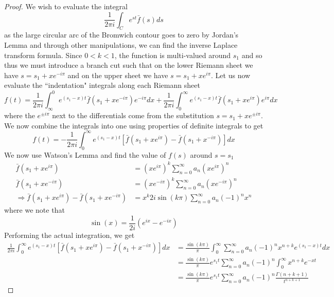 \documentclass{report}
\theoremstyle{definition}
\theoremstyle{remark}
\begin{document}
\begin{proof}
    We wish to evaluate the integral 
    \begin{equation*}
        \frac{1}{2\pi i}\int_C e^{st}\bar f(s) ds
    \end{equation*}
    as the large circular arc of the Bromwich contour goes to zero by Jordan's Lemma and through other manipulations, we can find the inverse Laplace transform formula. Since $0<k<1$, the function is multi-valued around $s_1$ and so thus we must introduce a branch cut such that on the lower Riemann sheet we have $s=s_1+xe^{-i\pi}$ and on the upper sheet we have $s=s_1+xe^{i\pi}$. Let us now evaluate the ``indentation" integrals along each Riemann sheet 
    \begin{equation*}
        f(t) = \frac{1}{2\pi i}\int_\infty^0 e^{(s_1-x)t}\bar f (s_1+xe^{-i\pi})e^{-i\pi}dx + \frac{1}{2\pi i}\int^\infty_0 e^{(s_1-x)t}\bar f(s_1+xe^{i\pi})e^{i\pi}dx
    \end{equation*}
    where the $e^{\pm i\pi}$ next to the differentials come from the substitution $s=s_1+xe^{\pm i\pi}$. We now combine the integrals into one using properties of definite integrals to get 
    \begin{equation*}
        f(t) = -\frac{1}{2\pi i}\int^\infty_0 e^{(s_1-x)t}[\bar f(s_1+xe^{i\pi}) - \bar f(s_1+x^{-i\pi})]dx
    \end{equation*}
    We now use Watson's Lemma and find the value of $f(s)$ around $s=s_1$ 
    \begin{equation*}
        \begin{split}
            \bar f(s_1+xe^{i\pi}) &= (xe^{i\pi})^k\sum^\infty_{n=0}a_n(xe^{i\pi})^n \\
            \bar f(s_1+xe^{-i\pi})&= (xe^{-i\pi})^k\sum^\infty_{n=0}a_n(xe^{-i\pi})^n \\
            \Rightarrow \bar f(s_1+xe^{i\pi})-\bar f(s_1+xe^{-i\pi})&=x^k2i \sin(k\pi)\sum^\infty_{n=0}a_n(-1)^nx^n
        \end{split}
    \end{equation*}
    where we note that 
    \begin{equation*}
        \sin (x) = \frac{1}{2i}(e^{ix}-e^{-ix})
    \end{equation*}
    Performing the actual integration, we get 
    \begin{equation*}
        \begin{split}
            \frac{1}{2\pi i}\int^\infty_0 e^{(s_1-x)t}[\bar f(s_1+xe^{i\pi}) - \bar f(s_1+x^{-i\pi})]dx &= \frac{\sin(k\pi)}{\pi} \int^\infty_0 \sum^\infty_{n=0}a_n(-1)^nx^{n+k}e^{(s_1-x)t}dx \\&= \frac{\sin(k\pi)}{\pi}e^{s_1 t}\sum^\infty_{n=0}a_n(-1)^n \int^\infty_0x^{n+k}e^{-xt} \\&=\frac{\sin(k\pi)}{\pi}e^{s_1 t}\sum^\infty_{n=0}a_n(-1)^n\frac{\Gamma(n+k+1)}{t^{n+k+1}}

\end{split}
\end{equation*}
\end{proof}
\end{document}
